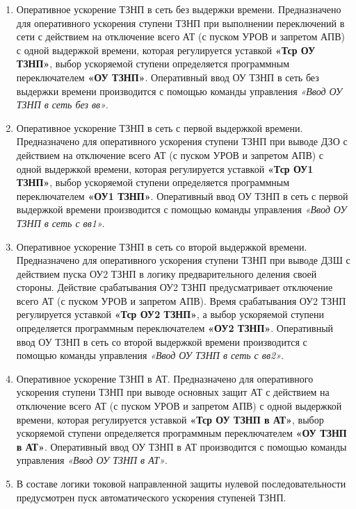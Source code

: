 \begin{enumerate}
\item
Оперативное ускорение ТЗНП в сеть без выдержки времени. Предназначено для оперативного ускорения ступени ТЗНП  при выполнении переключений в сети с действием на отключение всего АТ (с пуском УРОВ и запретом АПВ) с одной выдержкой времени, которая регулируется уставкой \textbf{«Тср ОУ ТЗНП»}, выбор ускоряемой ступени определяется программным переключателем \textbf{«ОУ ТЗНП»}. Оперативный ввод ОУ ТЗНП в сеть без выдержки времени производится с помощью команды управления \textit{«Ввод ОУ ТЗНП в сеть без вв»}. 

\item
Оперативное ускорение ТЗНП в сеть с первой выдержкой времени. Предназначено для оперативного ускорения ступени ТЗНП при выводе ДЗО с действием на отключение всего АТ (с пуском УРОВ и запретом АПВ) с одной выдержкой времени, которая регулируется уставкой \textbf{«Тср ОУ1 ТЗНП»}, выбор ускоряемой ступени определяется программным переключателем \textbf{«ОУ1 ТЗНП»}. Оперативный ввод ОУ ТЗНП в сеть с первой выдержкой времени производится с помощью команды управления \textit{«Ввод ОУ ТЗНП в сеть с вв1»}.

\item
Оперативное ускорение ТЗНП в сеть со второй выдержкой времени. Предназначено для оперативного ускорения ступени ТЗНП при выводе ДЗШ с действием пуска ОУ2 ТЗНП в логику предварительного деления своей стороны. Действие срабатывания ОУ2 ТЗНП предусматривает отключение всего АТ (с пуском УРОВ и запретом АПВ). Время срабатывания ОУ2 ТЗНП регулируется уставкой \textbf{«Тср ОУ2 ТЗНП»}, а выбор ускоряемой ступени определяется программным переключателем \textbf{«ОУ2 ТЗНП»}. Оперативный ввод ОУ ТЗНП в сеть со второй выдержкой времени производится с помощью команды управления \textit{«Ввод ОУ ТЗНП в сеть с вв2»}.

\item
Оперативное ускорение ТЗНП в АТ. Предназначено для оперативного ускорения ступени ТЗНП при выводе основных защит АТ с действием на отключение всего АТ (с пуском УРОВ и запретом АПВ) с одной выдержкой времени, которая регулируется уставкой \textbf{«Тср ОУ ТЗНП в АТ»}, выбор ускоряемой ступени определяется программным переключателем \textbf{«ОУ ТЗНП в АТ»}. Оперативный ввод ОУ ТЗНП в АТ производится с помощью команды управления \textit{«Ввод ОУ ТЗНП в АТ»}.

\item
В составе логики токовой направленной защиты нулевой последовательности предусмотрен пуск автоматического ускорения ступеней ТЗНП.


\end{enumerate}
